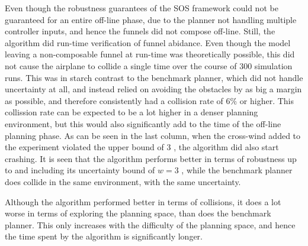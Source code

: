 Even though the robustness guarantees of the SOS framework could not be
guaranteed for an entire off-line phase, due to the planner not handling
multiple controller inputs, and hence the funnels did not compose off-line.
Still, the \rrtfunnel{} algorithm did run-time verification of funnel abidance.
Even though the model leaving a non-composable funnel at run-time was
theoretically possible, this did not cause the airplane to collide a single time
over the course of \(300\) simulation runs. This was in starch contrast to the
benchmark planner, which did not handle uncertainty at all, and instead relied
on avoiding the obstacles by as big a margin as possible, and therefore
consistently had a collision rate of \(6\%\) or higher. This collission rate can
be expected to be a lot higher in a denser planning environment, but this would
also significantly add to the time of the off-line planning phase. As can be
seen in the last column, when the cross-wind added to the experiment violated
the upper bound of \(3\) , the \rrtfunnel{} algorithm did also
start crashing. It is seen that the
\rrtfunnel{} algorithm performs better in terms of robustness up to and
including its uncertainty bound of \( w = 3 \) , while the
benchmark planner does collide in the same environment, with the same
uncertainty.

Although the \rrtfunnel{} algorithm performed better in terms of collisions, it
does a lot worse in terms of exploring the planning space, than does the
benchmark planner. This only increases with the difficulty of the planning
space, and hence the time spent by the \rrtfunnel{} algorithm is significantly
longer.
